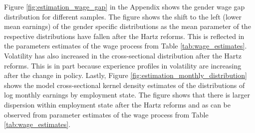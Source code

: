 \documentclass[12pt, a4paper]{article}
\let\Oldsubsection\subsection
\renewcommand{\subsection}{\FloatBarrier\Oldsubsection}
\begin{document}

Figure \ref{fig:estimation_wage_gap} in the Appendix shows the gender wage gap distribution for different samples. The figure shows the shift to the left (lower mean earnings) of the gender specific distributions as the mean parameter of the respective distributions have fallen after the Hartz reforms. This is reflected in the parameters estimates of the wage process from Table \ref{tab:wage_estimates}. Volatility has also increased in the cross-sectional distribution after the Hartz reforms. This is in part because experience profiles in volatility are increasing after the change in policy. Lastly, Figure \ref{fig:estimation_monthly_distribution} shows the model cross-sectional kernel density estimates of the distributions of log monthly earnings by employment state. The figure shows that there is larger dispersion within employment state after the Hartz reforms and as can be observed from parameter estimates of the wage process from Table \ref{tab:wage_estimates}.

\end{document}
